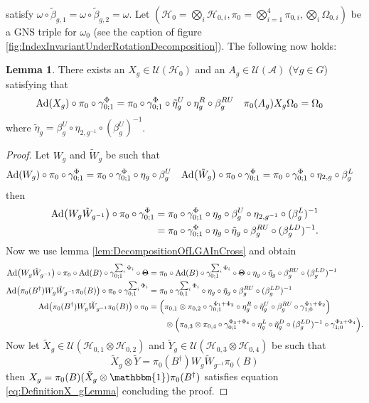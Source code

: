 \documentclass[12pt,a4paper,twoside]{article}
\newcommand{\stkout}[1]{\ifmmode\text{\sout{\ensuremath{#1}}}\else\sout{#1}\fi}
\let\originalleft\left
\let\originalright\right
\renewcommand{\left}{\mathopen{}\mathclose\bgroup\originalleft}
\renewcommand{\right}{\aftergroup\egroup\originalright}
\newcommand{\UU}{\mathcal U}
\newcommand{\HH}{\mathcal H}
\renewcommand{\AA}{\mathcal A}
\newcommand{\id}{\mathbbm{1}}
\newcommand{\Ad}[1]{\textrm{Ad}\left(#1\right)}
\theoremstyle{definition}
\newtheorem{lemma}[theorem]{Lemma}
\numberwithin{equation}{section}
\begin{document}
satisfy $\omega\circ\tilde{\beta}_{g,1}=\omega\circ\tilde{\beta}_{g,2}=\omega$. Let $(\HH_0=\bigotimes_i\HH_{0,i},\pi_0=\bigotimes_{i=1}^4\pi_{0,i},\bigotimes_i\Omega_{0,i})$ be a GNS triple for $\omega_0$ (see the caption of figure \ref{fig:IndexInvariantUnderRotationDecomposition}). The following now holds:
\begin{lemma}\label{lem:DefinitionX_gLemma}
	There exists an $X_g\in\UU(\HH_0)$ and an $A_g\in\UU(\AA)$ ($\forall g\in G$) satisfying that
	\begin{align}\label{eq:DefinitionX_gLemma}
		\Ad{X_g}\circ\pi_0\circ\gamma^\Phi_{0;1}&=\pi_0\circ\gamma^\Phi_{0;1}\circ\tilde{\eta}^U_g\circ\eta^R_g\circ\beta_g^{RU}&\pi_0(A_g)X_g\Omega_0&=\Omega_0
	\end{align}
	where $\tilde{\eta}_g=\beta_g^U\circ\eta_{2,g^{-1}}\circ(\beta_g^U)^{-1}$.
\end{lemma}
\begin{proof}
	Let $W_g$ and $\tilde W_g$ be such that
	\begin{align}
		\Ad{W_g}\circ\pi_0\circ\gamma^\Phi_{0;1}& =\pi_0\circ\gamma^\Phi_{0;1}\circ\eta_g\circ\beta_g^U
		&\Ad{\tilde W_g} \circ\pi_0\circ\gamma^\Phi_{0;1}& =\pi_0\circ\gamma^\Phi_{0;1}\circ\eta_{2,g}\circ\beta_g^L
	\end{align}
	then
	\begin{align}
		\Ad{W_g\tilde{W}_{g^{-1}}}\circ\pi_0\circ\gamma^\Phi_{0;1}&=\pi_0\circ\gamma^\Phi_{0;1}\circ\eta_g\circ\beta_g^U\circ\eta_{2,g^{-1}}\circ(\beta_g^L)^{-1}\\
		&=\pi_0\circ\gamma^\Phi_{0;1}\circ\eta_g\circ\tilde{\eta}_g\circ\beta_g^{RU}\circ(\beta_g^{LD})^{-1}.
	\end{align}
	Now we use lemma \ref{lem:DecompositionOfLGAInCross} and obtain
	\begin{align}
		\Ad{W_g\tilde{W}_{g^{-1}}}\circ\pi_0\circ\Ad{B}\circ\gamma^{\sum_i\Phi_i}_{0;1}\circ\stkout{\Theta}&=\pi_0\circ\Ad{B}\circ\gamma^{\sum_i\Phi_i}_{0;1}\circ\stkout{\Theta}\circ\eta_g\circ\tilde{\eta}_g\circ\beta_g^{RU}\circ(\beta_g^{LD})^{-1}\\
		\Ad{\pi_0(B^\dagger)W_g\tilde{W}_{g^{-1}}\pi_0(B)}\circ\pi_0\circ\gamma^{\sum_i\Phi_i}_{0;1}&=\pi_0\circ\gamma^{\sum_i\Phi_i}_{0;1}\circ\eta_g\circ\tilde{\eta}_g\circ\beta_g^{RU}\circ(\beta_g^{LD})^{-1}\\
		\Ad{\pi_0(B^\dagger)W_g\tilde{W}_{g^{-1}}\pi_0(B)}\circ\pi_0&=\left(\pi_{0,1}\otimes\pi_{0,2}\circ\gamma^{\Phi_1+\Phi_2}_{0;1}\circ\eta_g^R\circ\tilde{\eta}_g^U\circ\beta_g^{RU}\circ\gamma^{\Phi_1+\Phi_2}_{1;0}\right)\\
		\nonumber
		&\qquad\otimes \left(\pi_{0,3}\otimes\pi_{0,4}\circ\gamma^{\Phi_3+\Phi_4}_{0;1}\circ\eta_g^L\circ\tilde{\eta}_g^D\circ(\beta_g^{LD})^{-1}\circ\gamma^{\Phi_3+\Phi_4}_{1;0}\right).
	\end{align}
	Now let $\tilde{X}_g\in\UU(\HH_{0,1}\otimes\HH_{0,2})$ and $\tilde{Y}_g\in\UU(\HH_{0,3}\otimes\HH_{0,4})$ be such that
	\begin{equation}
		\tilde{X}_g\otimes\tilde{Y}=\pi_0(B^\dagger)W_g\tilde{W}_{g^{-1}}\pi_0(B)
	\end{equation}
	then $X_g=\pi_0(B)(\tilde{X}_g\otimes\id)\pi_0(B^\dagger)$ satisfies equation \eqref{eq:DefinitionX_gLemma} concluding the proof.
\end{proof}
\end{document}
